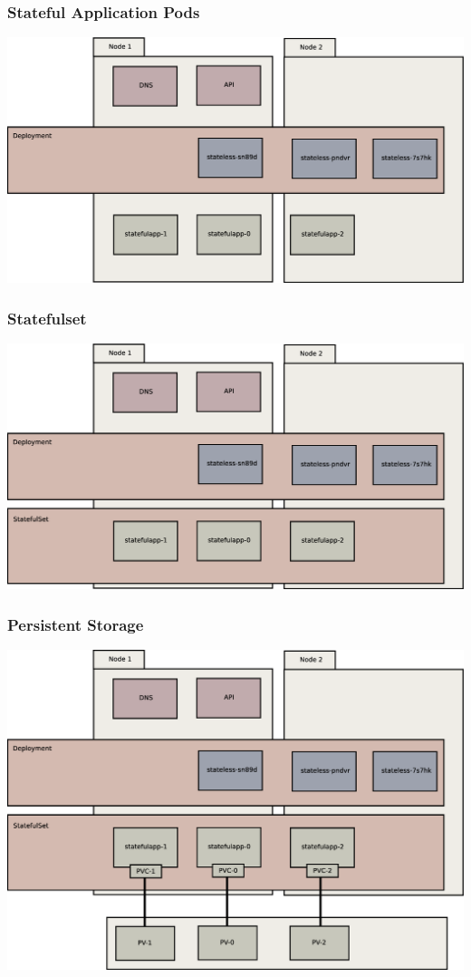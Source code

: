 \documentclass{beamer}
\begin{document}
\begin{frame}
\frametitle{Stateful Application Pods}
\includegraphics[width=\textwidth,height=\textheight,keepaspectratio]{graphics/04-statefulAppPods.eps}
\end{frame}

\begin{frame}
\frametitle{Statefulset}
\includegraphics[width=\textwidth,height=\textheight,keepaspectratio]{graphics/05-statefulSet.eps}
\end{frame}

\begin{frame}
\frametitle{Persistent Storage}
\includegraphics[width=\textwidth,height=\textheight,keepaspectratio]{graphics/06-persistence.eps}
\end{frame}
\end{document}
